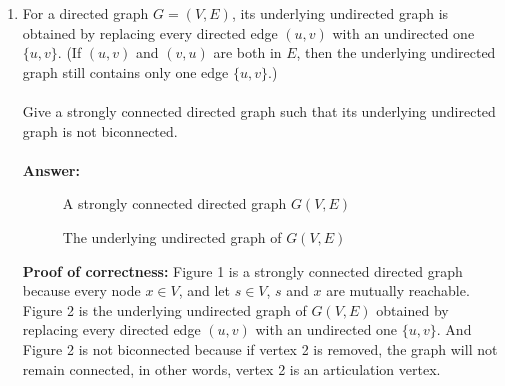 \documentclass[11pt]{article}
\theoremstyle{definition}
\begin{document}
\begin{enumerate}
\begin{enumerate}
\item %
For a directed graph $G=(V, E)$, its underlying undirected graph is obtained by replacing every directed edge $(u, v)$ with an undirected one $\{u, v\}$. (If $(u, v)$ and $(v, u)$ are both in $E$, then the underlying undirected graph still contains only one edge $\{u, v\}$.) \\
\\
Give a strongly connected directed graph such that its underlying undirected graph is not biconnected.
\\\\
\textbf{Answer:} \\

\begin{figure}[htbp]
\centering
{}
\caption{\label{fig: } A strongly connected directed graph $G(V, E)$}
\end{figure}

\begin{figure}[htbp]
\centering
{}
\caption{\label{fig: } The underlying undirected graph of $G(V, E)$}
\end{figure}

\textbf{Proof of correctness:} Figure 1 is a strongly connected directed graph because every node $x \in V$, and let $s \in V$, $s$ and $x$ are mutually reachable. Figure 2 is the underlying undirected graph of $G(V, E)$ obtained by replacing every directed edge $(u, v)$ with an undirected one $\{u, v\}$. And Figure 2 is not biconnected because if vertex 2 is removed, the graph will not remain connected, in other words, vertex 2 is an articulation vertex.



\end{enumerate}
\end{enumerate}
\end{document}

